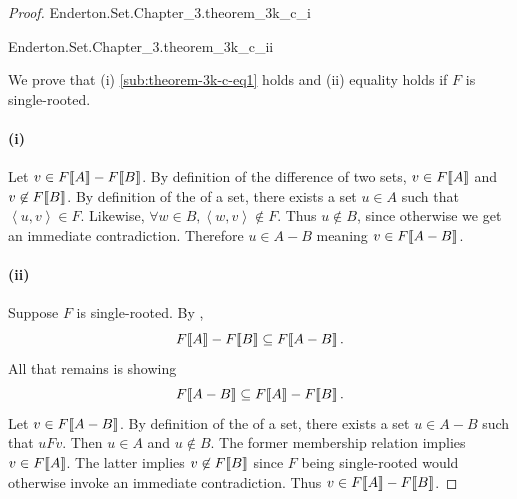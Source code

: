 \documentclass{report}
\newcommand{\pair}[1]{\left< #1 \right>}
\begin{document}
\begin{proof}

  \statementpadding

    {Enderton.Set.Chapter\_3.theorem\_3k\_c\_i}

    {Enderton.Set.Chapter\_3.theorem\_3k\_c\_ii}

  We prove that (i) \eqref{sub:theorem-3k-c-eq1} holds and (ii) equality holds
    if $F$ is single-rooted.

  \paragraph{(i)}%

    Let $v \in F\!\left\llbracket A\right\rrbracket - F\!\left\llbracket B\right\rrbracket$.
    By definition of the difference of two sets,
      $v \in F\!\left\llbracket A\right\rrbracket$ and $v \not\in F\!\left\llbracket B\right\rrbracket$.
    By definition of the  of a set, there exists a set
      $u \in A$ such that $\pair{u, v} \in F$.
    Likewise, $\forall w \in B, \pair{w, v} \not\in F$.
    Thus $u \not\in B$, since otherwise we get an immediate contradiction.
    Therefore $u \in A - B$ meaning $v \in F\!\left\llbracket A - B\right\rrbracket$.

  \paragraph{(ii)}%

    Suppose $F$ is single-rooted.
    By ,
      $$F\!\left\llbracket A\right\rrbracket - F\!\left\llbracket B\right\rrbracket \subseteq F\!\left\llbracket A - B\right\rrbracket.$$
    All that remains is showing
      $$F\!\left\llbracket A - B\right\rrbracket \subseteq F\!\left\llbracket A\right\rrbracket - F\!\left\llbracket B\right\rrbracket.$$
    Let $v \in F\!\left\llbracket A - B\right\rrbracket$.
    By definition of the  of a set, there exists a set
      $u \in A - B$ such that $uFv$.
    Then $u \in A$ and $u \not\in B$.
    The former membership relation implies $v \in F\!\left\llbracket A\right\rrbracket$.
    The latter implies $v \not\in F\!\left\llbracket B\right\rrbracket$ since $F$ being single-rooted
      would otherwise invoke an immediate contradiction.
    Thus $v \in F\!\left\llbracket A\right\rrbracket - F\!\left\llbracket B\right\rrbracket$.

\end{proof}

\subsection{}%
\end{document}
